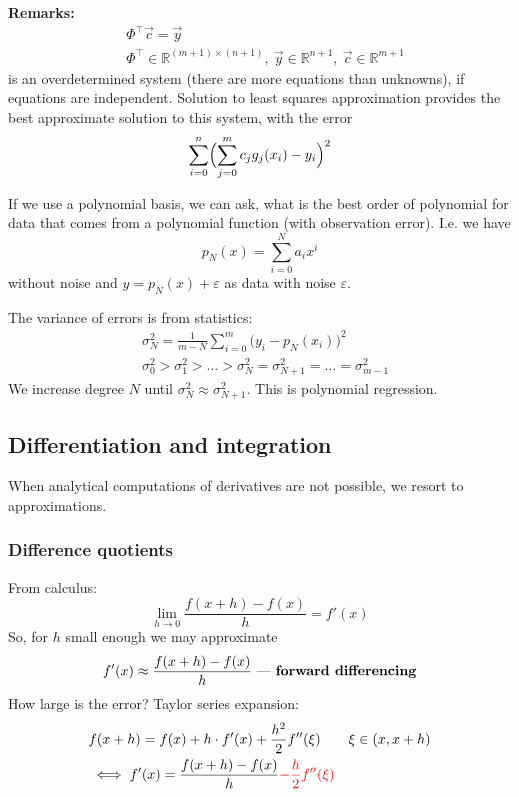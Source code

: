 \textbf{Remarks:}
\begin{align*}
    &
    \Phi^\intercal \vec{c} = \vec{y}
    \\&
    \Phi^\intercal \in \mathbb{R}^{(m+1) \times (n + 1)},\
    \vec{y} \in \mathbb{R}^{n+1},\
    \vec{c} \in \mathbb{R}^{m+1}
\end{align*}
is an overdetermined system (there are more equations than unknowns), if equations are independent.
Solution to least squares approximation provides the best approximate
solution to this system, with the error
\[
    \sum_{i=0}^n \Bigl(
        \sum_{j=0}^m c_j g_j(x_i) - y_i
    \Bigr)^2
\]

If we use a polynomial basis, we can ask, what is the best order of polynomial
for data that comes from a polynomial function (with observation error).
I.e. we have
\[ p_N(x) = \sum_{i=0}^N a_i x^i \]
without noise and $y = p_N(x) + \varepsilon$ as data with noise $\varepsilon$.

The variance of errors is from statistics:
\begin{align*}
    &
    \sigma_N^2 = \frac{1}{m - N} \sum_{i=0}^m \bigl(y_i - p_N(x_i)\bigr)^2
    \\&
    \sigma_0^2 > \sigma_1^2 > \dots > \sigma_N^2 = \sigma_{N+1}^2 = \dots = 
    \sigma_{m-1}^2
\end{align*}
We increase degree $N$ until $\sigma_N^2 \approx \sigma_{N+1}^2$.
This is polynomial regression.

\subsection{Differentiation and integration}
When analytical computations of derivatives are not possible, we resort to approximations.
\subsubsection{Difference quotients}
From calculus:
\[
    \lim_{h \to 0} \frac{f(x+h) - f(x)}{h} = f'(x)
\]
So, for $h$ small enough we may approximate
\[
    f'(x) \approx \frac{f(x+h) - f(x)}{h} \text{ --- \textbf{forward differencing}}
\]
How large is the error?
Taylor series expansion:
\begin{align*}
    &f(x+h) = f(x) + h \cdot f'(x) + \frac{h^2}{2} f''(\xi) \qquad \xi \in (x, x + h)
    \\&\iff
    f'(x) = \frac{f(x+h) - f(x)}{h} \textcolor{red}{- \frac{h}{2} f''(\xi)}
\end{align*}

